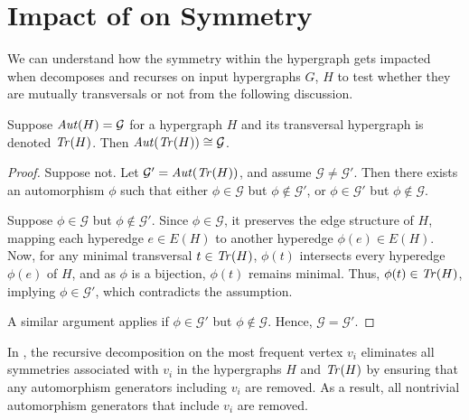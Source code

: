 \section{Impact of \FKA{} on Symmetry}

We can understand how the symmetry within the hypergraph gets impacted when \FKA{} decomposes and recurses on input hypergraphs $G$, $H$ to test whether they are mutually transversals or not from the following discussion.

\begin{lemma}\label{lem:aut-tr}
Suppose $\mathit{Aut}(H)=\mathcal{G}$ for a hypergraph $H$ and its transversal hypergraph is denoted $\mathit{Tr}(H)$. Then $\mathit{Aut}(\mathit{Tr}(H))\cong\mathcal{G}$.
\end{lemma}

\begin{proof}
Suppose not. Let $\mathcal{G}'=\mathit{Aut}(\mathit{Tr}(H))$, and assume $\mathcal{G}\neq\mathcal{G}'$. Then there exists an automorphism $\phi$ such that either $\phi\in\mathcal{G}$ but $\phi\notin\mathcal{G}'$, or $\phi\in\mathcal{G}'$ but $\phi\notin\mathcal{G}$.

Suppose $\phi\in\mathcal{G}$ but $\phi\notin\mathcal{G}'$. Since $\phi\in\mathcal{G}$, it preserves the edge structure of $H$, mapping each hyperedge $e\in E(H)$ to another hyperedge $\phi(e)\in E(H)$. Now, for any minimal transversal $t\in\mathit{Tr}(H)$, $\phi(t)$ intersects every hyperedge $\phi(e)$ of $H$, and as $\phi$ is a bijection, $\phi(t)$ remains minimal. Thus, $\phi(t)\in\mathit{Tr}(H)$, implying $\phi\in\mathcal{G}'$, which contradicts the assumption.

A similar argument applies if $\phi\in\mathcal{G}'$ but $\phi\notin\mathcal{G}$. Hence, $\mathcal{G}=\mathcal{G}'$.
\end{proof}

\begin{lemma}\label{lem:break}
In \FKA, the recursive decomposition on the most frequent vertex $v_i$ eliminates all symmetries associated with $v_i$ in the hypergraphs $H$ and $\mathit{Tr}(H)$ by ensuring that any automorphism generators including $v_i$ are removed. As a result, all nontrivial automorphism generators that include $v_i$ are removed.
\end{lemma}

